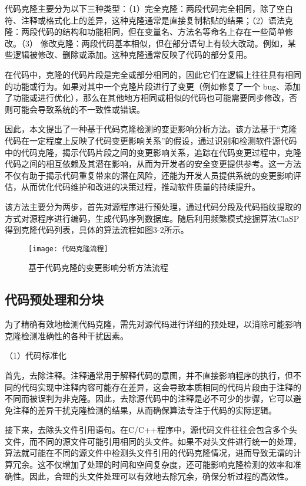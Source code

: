 代码克隆主要分为以下三种类型：（1）完全克隆：两段代码完全相同，除了空白符、注释或格式化上的差异，这种克隆通常是直接复制粘贴的结果；（2）语法克隆：两段代码的结构和功能相同，但在变量名、方法名等命名上存在一些简单修改。（3） 修改克隆：两段代码基本相似，但在部分语句上有较大改动。例如，某些逻辑被修改、删除或添加。这种克隆通常反映了代码的部分复用。


在代码中，克隆的代码片段是完全或部分相同的，因此它们在逻辑上往往具有相同的功能或行为。如果对其中一个克隆片段进行了变更（例如修复了一个 bug、添加了功能或进行优化），那么在其他地方相同或相似的代码也可能需要同步修改，否则可能会导致系统的不一致性或错误。

因此，本文提出了一种基于代码克隆检测的变更影响分析方法。该方法基于“克隆代码在一定程度上反映了代码变更影响关系”的假设，通过识别和检测软件源代码中的代码克隆，揭示代码片段之间的变更影响关系，追踪在代码变更过程中，克隆代码之间的相互依赖及其潜在影响，从而为开发者的安全变更提供参考。这一方法不仅有助于揭示代码重复带来的潜在风险，还能为开发人员提供系统的变更影响评估，从而优化代码维护和改进的决策过程，推动软件质量的持续提升。

该方法主要分为两步，首先对源程序进行预处理，通过代码分段及代码指纹提取的方式对源程序进行编码，生成代码序列数据库。随后利用频繁模式挖掘算法ClaSP得到克隆代码列表，具体的算法流程如图3-2所示。

\begin{figure}[h]
\centering
\texttt{[image: 代码克隆流程]}
\caption{基于代码克隆的变更影响分析方法流程}
\end{figure}



\subsection{代码预处理和分块}

为了精确有效地检测代码克隆，需先对源代码进行详细的预处理，以消除可能影响克隆检测准确性的各种干扰因素。

（1）代码标准化

首先，去除注释。注释通常用于解释代码的意图，并不直接影响程序的执行，但不同的代码实现中注释内容可能存在差异，这会导致本质相同的代码片段由于注释的不同而被误判为非克隆。因此，去除源代码中的注释是必不可少的步骤，它可以避免注释的差异干扰克隆检测的结果，从而确保算法专注于代码的实际逻辑。

接下来，去除头文件引用语句。在C/C++程序中，源代码文件往往会包含多个头文件，而不同的源文件可能引用相同的头文件。如果不对头文件进行统一的处理，算法就可能在不同的源文件中检测头文件引用的代码克隆情况，进而导致无谓的计算冗余。这不仅增加了处理的时间和空间复杂度，还可能影响克隆检测的效率和准确性。因此，合理的头文件处理可以有效地去除冗余，确保分析过程的高效性。

